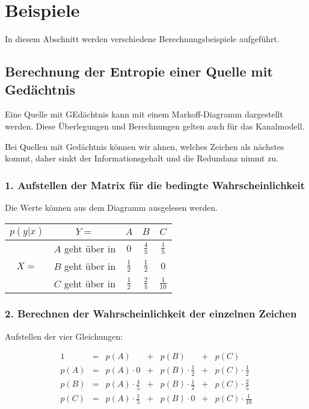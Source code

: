 \section{Beispiele}

In diesem Abschnitt werden verschiedene Berechnungsbeispiele aufgeführt.


\subsection{Berechnung der Entropie einer Quelle mit Gedächtnis}

Eine Quelle mit GEdächtnis kann mit einem Markoff-Diagramm dargestellt werden.
Diese Überlegungen und Berechnungen gelten auch für das Kanalmodell.

Bei Quellen mit Gedächtnis können wir ahnen, welches Zeichen als nächstes kommt,
daher sinkt der Informationsgehalt und die Redundanz nimmt zu.




\subsubsection*{1. Aufstellen der Matrix für die bedingte Wahrscheinlichkeit}

Die Werte können aus dem Diagramm ausgelesen werden.

\begin{tabular}[H]{|c|c|c|c|c|}
	\hline
	$p(y|x)$ & $Y=$ & $A$ & $B$ & $C$ \\
	\hline
	\multirow{3}{*}{$X=$} & $A$ geht über in & $0$ & $\frac{4}{5}$ & $\frac{1}{5}$ \\
	\cline{2-5}
	& $B$ geht über in & $\frac{1}{2}$ & $\frac{1}{2}$ & $0$ \\
	\cline{2-5}
	& $C$ geht über in & $\frac{1}{2}$ & $\frac{2}{5}$ & $\frac{1}{10}$ \\
	\hline
\end{tabular}


\subsubsection*{2. Berechnen der Wahrscheinlichkeit der einzelnen Zeichen}

Aufstellen der vier Gleichungen:

\begin{equation*}
	\begin{array}{rclclcl}
		1    &=& p(A)                   &+& p(B)                   &+& p(C) \\
		p(A) &=& p(A) \cdot 0           &+& p(B) \cdot \frac{1}{2} &+& p(C) \cdot \frac{1}{2} \\
		p(B) &=& p(A) \cdot \frac{4}{5} &+& p(B) \cdot \frac{1}{2} &+& p(C) \cdot \frac{2}{5} \\
		p(C) &=& p(A) \cdot \frac{1}{5} &+& p(B) \cdot 0           &+& p(C) \cdot \frac{1}{10}
	\end{array}
\end{equation*}

